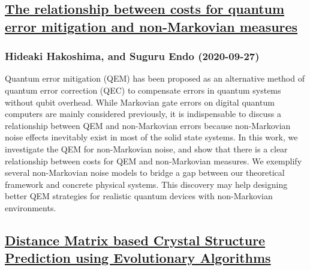 \subsection*{\href{http://arxiv.org/abs/2009.12759v1}{The relationship between costs for quantum error mitigation and  non-Markovian measures}}
\subsubsection*{Hideaki Hakoshima, and Suguru Endo (2020-09-27)}
Quantum error mitigation (QEM) has been proposed as an alternative method of
quantum error correction (QEC) to compensate errors in quantum systems without
qubit overhead. While Markovian gate errors on digital quantum computers are
mainly considered previously, it is indispensable to discuss a relationship
between QEM and non-Markovian errors because non-Markovian noise effects
inevitably exist in most of the solid state systems. In this work, we
investigate the QEM for non-Markovian noise, and show that there is a clear
relationship between costs for QEM and non-Markovian measures. We exemplify
several non-Markovian noise models to bridge a gap between our theoretical
framework and concrete physical systems. This discovery may help designing
better QEM strategies for realistic quantum devices with non-Markovian
environments.

\subsection*{\href{http://arxiv.org/abs/2009.13955v1}{Distance Matrix based Crystal Structure Prediction using Evolutionary  Algorithms}}
